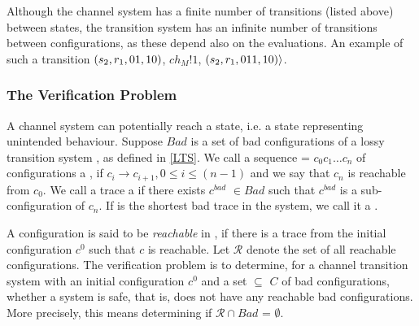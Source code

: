 Although the channel system has a finite number of transitions (listed above) between states, the transition system has an infinite number of transitions between configurations, as these depend also on the evaluations. An example of such a transition $(s_2,r_1,01,10)$, $ch_M!1$, $(s_2,r_1,011,10)\rangle$.

\subsubsection{The Verification Problem}
A channel system can potentially reach a  state, i.e. a state representing unintended behaviour. Suppose $Bad$ is a set of bad configurations of a lossy transition system , as defined in \ref{LTS}. We call a sequence  = $c_0c_1\ldots c_n$ of configurations a , if $c_i \rightarrow c_{i+1}, 0 \leq i \leq (n-1)$ and we say that $c_n$ is reachable from $c_0$. We call a trace a  if there exists $c^{bad}$ $\in Bad$ such that $c^{bad}$ is a sub-configuration of $c_n$. If  is the shortest bad trace in the system, we call it a .

A configuration  is said to be \emph{reachable} in , if there is a trace from the initial configuration $c^0$ such that $c$ is reachable. Let $\mathcal{R}$ denote the set of all reachable configurations. The verification problem is to determine, for a channel transition system  with an initial configuration $c^0$ and a set  $\subseteq$ $C$ of bad configurations, whether a system is safe, that is, does not have any reachable bad configurations. More precisely, this means determining if $\mathcal{R} \cap Bad$ = $\emptyset$.

